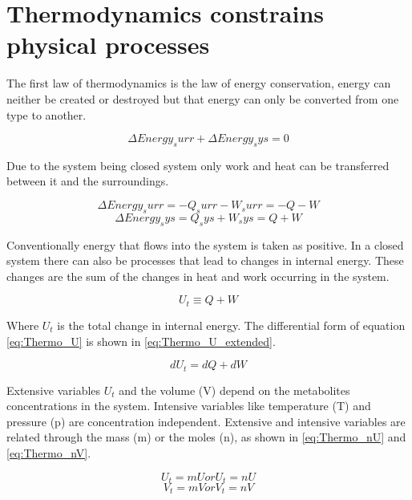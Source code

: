 \section{Thermodynamics constrains physical processes}
The first law of thermodynamics is the law of energy conservation, energy can neither be created or destroyed but that energy can only be converted from one type to another.

\begin{equation}
    \Delta Energy_surr + \Delta Energy_sys = 0  
    \label{eq:Thermo_Sys_Surr}
\end{equation}

Due to the system being closed system only work and heat can be transferred between it and the surroundings.

\begin{equation}
    \Delta Energy_surr = - Q_surr - W_surr = - Q - W
    \label{eq:Thermo_Work_Heat_1}
\end{equation}
\begin{equation}
    \Delta Energy_sys = Q_sys + W_sys = Q + W
    \label{eq:Thermo_Work_Heat_2}
\end{equation}

Conventionally energy that flows into the system is taken as positive.
In a closed system there can also be processes that lead to changes in internal energy. These changes are the sum of the changes in heat and work occurring in the system.

\begin{equation}
    U_t \equiv Q + W
    \label{eq:Thermo_U}
\end{equation}

Where $U_t$ is the total change in internal energy. The differential form of equation \ref{eq:Thermo_U} is shown in \ref{eq:Thermo_U_extended}.

\begin{equation}
    dU_t = dQ + dW 
    \label{eq:Thermo_U_small}
\end{equation}

Extensive variables $U_t$ and the volume (V) depend on the metabolites concentrations in the system. Intensive variables like temperature (T) and pressure (p) are concentration independent. Extensive and intensive variables are related through the mass (m) or the moles (n), as shown in \ref{eq:Thermo_nU} and \ref{eq:Thermo_nV}.

\begin{equation}
    U_t = mU or U_t = nU
    \label{eq:Thermo_nU}
\end{equation}
\begin{equation}
    V_t = mV or V_t = nV  
    \label{eq:Thermo_nV}
\end{equation}

